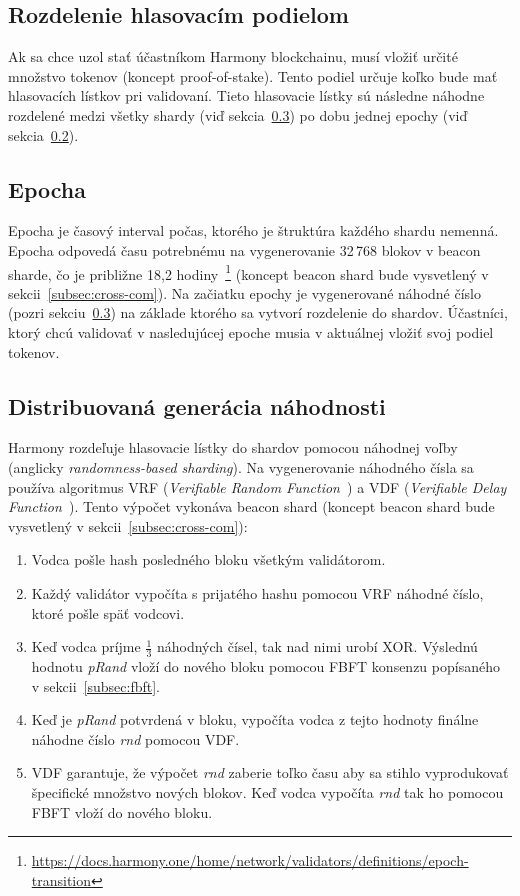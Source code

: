 \subsection{Rozdelenie hlasovacím podielom}\label{subsec:rand-dist}
Ak sa chce uzol stať účastníkom Harmony blockchainu, musí vložiť určité množstvo tokenov (koncept proof-of-stake). Tento podiel určuje koľko bude mať hlasovacích lístkov pri validovaní. Tieto hlasovacie lístky sú následne náhodne rozdelené medzi všetky shardy (viď sekcia~\ref{subsec:rnd}) po dobu jednej epochy (viď sekcia~\ref{subsec:epoch}).

\subsection{Epocha}\label{subsec:epoch}
Epocha je časový interval počas, ktorého je štruktúra každého shardu nemenná. Epocha odpovedá času potrebnému na vygenerovanie 32\,768 blokov v beacon sharde, čo je približne 18,2 hodiny~\footnote{\url{https://docs.harmony.one/home/network/validators/definitions/epoch-transition}} (koncept beacon shard bude vysvetlený v sekcii~\ref{subsec:cross-com}). Na začiatku epochy je vygenerované náhodné číslo (pozri sekciu~\ref{subsec:rnd}) na základe ktorého sa vytvorí rozdelenie do shardov. Účastníci, ktorý chcú validovať v nasledujúcej epoche musia v aktuálnej vložiť svoj podiel tokenov.

\subsection{Distribuovaná generácia náhodnosti}\label{subsec:rnd}
Harmony rozdeľuje hlasovacie lístky do shardov pomocou náhodnej voľby (anglicky \textit{randomness-based sharding}). Na vygenerovanie náhodného čísla sa používa algoritmus VRF (\textit{Verifiable Random Function~\cite{algorandGilad}}) a VDF (\textit{Verifiable Delay Function~\cite{vdfBoneh}}). Tento výpočet vykonáva beacon shard (koncept beacon shard bude vysvetlený v sekcii~\ref{subsec:cross-com}):
\begin{enumerate}
	\item Vodca pošle hash posledného bloku všetkým validátorom.
	\item Každý validátor vypočíta s prijatého hashu pomocou VRF náhodné číslo, ktoré pošle späť vodcovi.
	\item Keď vodca príjme $\frac{1}{3}$ náhodných čísel, tak nad nimi urobí XOR. Výslednú hodnotu \textit{pRand} vloží do nového bloku pomocou FBFT konsenzu popísaného v sekcii~\ref{subsec:fbft}.
	\item Keď je \textit{pRand} potvrdená v bloku, vypočíta vodca z tejto hodnoty finálne náhodne číslo \textit{rnd} pomocou VDF.
	\item VDF garantuje, že výpočet \textit{rnd} zaberie toľko času aby sa stihlo vyprodukovať špecifické množstvo nových blokov. Keď vodca vypočíta \textit{rnd} tak ho pomocou FBFT vloží do nového bloku.
\end{enumerate}

